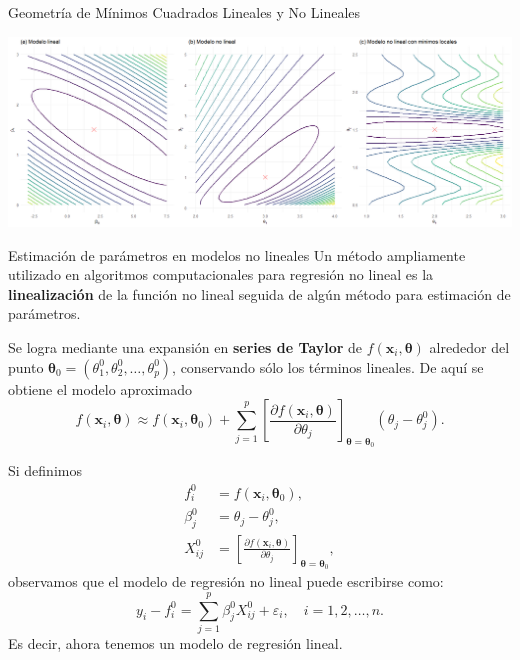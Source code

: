 \documentclass[aspectratio = 169, spanish]{beamer}
\begin{document}
\begin{frame}{Geometría de Mínimos Cuadrados Lineales y No Lineales}
\begin{center}
     \includegraphics[scale=0.46]{proy1.png}
\end{center}
   
\end{frame}



\begin{frame}{Estimación de parámetros en modelos no lineales}
    Un método ampliamente utilizado en algoritmos computacionales para regresión no lineal es la \textbf{linealización} de la función no lineal seguida de algún método para estimación de parámetros.

    Se logra mediante una expansión en \textbf{series de Taylor} de $f(\bm x_i, \bm\theta)$ alrededor del punto $\bm\theta_0 = (\theta_{1}^{0}, \theta_{2}^{0}, \ldots, \theta_{p}^{0})$, conservando sólo los términos lineales. De aquí se obtiene el modelo aproximado
    \begin{equation}\label{Eq1-Sec1.3.1}
        f(\bm{x}_i, \bm{\theta}) \approx f(\bm{x}_i, \bm{\theta}_0) + \sum_{j=1}^p \left[ \frac{\partial f(\bm{x}_i, \bm{\theta})}{\partial \theta_j} \right]_{\bm{\theta} = \bm{\theta}_0} (\theta_j - \theta_{j}^{0}).
    \end{equation}
\end{frame}

\begin{frame}
    Si definimos
\[
\begin{split}
    f_i^0 &= f(\bm{x}_i, \bm{\theta}_0),\\
    \beta_j^0 &= \theta_j - \theta_{j}^{0},\\
    X_{ij}^0 &= \left[ \frac{\partial f(\bm{x}_i, \bm{\theta})}{\partial \theta_j} \right]_{\bm{\theta} = \bm{\theta}_0},
\end{split}
\]
observamos que el modelo de regresión no lineal puede escribirse como:
\begin{equation}\label{Eq2-Sec1.3.1}
    y_i - f_i^0 = \sum_{j=1}^{p} \beta_j^0 X_{ij}^0 + \varepsilon_i, \quad i = 1, 2, \ldots, n.
\end{equation}
Es decir, ahora tenemos un modelo de regresión lineal.
\end{frame}
\end{document}
